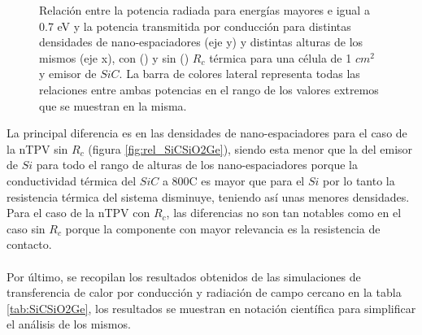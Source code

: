 \begin{figure}[H]
\begin{subfigure}[b]{0.49\textwidth}
		\caption{ }
		\label{fig:rel_SiCSiO2Ge_Rc}
	\end{subfigure}
	\caption{\small
	Relación entre la potencia radiada para energías mayores e igual a 0.7 eV y la potencia transmitida por conducción para distintas densidades de nano-espaciadores (eje y) y distintas alturas de los mismos (eje x), con () y sin () $R_c$ térmica para una célula de 1 $cm^2$ y emisor de $SiC$. La barra de colores lateral representa todas las relaciones entre ambas potencias en el rango de los valores extremos que se muestran en la misma.
	}
	\label{fig:relation_SiCSiO2Ge}
\end{figure}
La principal diferencia es en las densidades de nano-espaciadores para el caso de la nTPV sin $R_c$ (figura \ref{fig:rel_SiCSiO2Ge}), siendo esta menor que la del emisor de $Si$ para todo el rango de alturas de los nano-espaciadores porque la conductividad térmica del $SiC$ a 800\textdegree C es mayor que para el $Si$ por lo tanto la resistencia térmica del sistema disminuye, teniendo así unas menores densidades. Para el caso de la nTPV con $R_c$, las diferencias no son tan notables como en el caso sin $R_c$ porque la componente con mayor relevancia es la resistencia de contacto.\\\\
Por último, se recopilan los resultados obtenidos de las simulaciones de transferencia de calor por conducción y radiación de campo cercano en la tabla \ref{tab:SiCSiO2Ge}, los resultados se muestran en notación científica para simplificar el análisis de los mismos.
